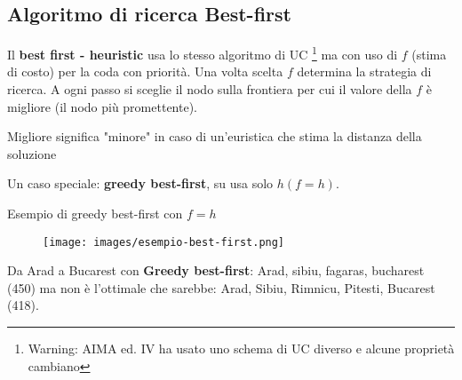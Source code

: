 \subsection{Algoritmo di ricerca Best-first}
Il \textbf{best first - heuristic} usa lo stesso algoritmo di UC \footnote{Warning: AIMA ed. IV ha usato uno schema di
UC diverso e alcune proprietà cambiano} ma con uso di $f$ (stima di costo) per la coda con priorità.
Una volta scelta $f$ determina la strategia di ricerca. A ogni passo si sceglie il nodo sulla frontiera per cui il valore della $f$ è 
migliore (il nodo più promettente).
\begin{note}
    Migliore significa "minore" in caso di un'euristica che stima la distanza della soluzione
\end{note}
\hspace{-15pt}Un caso speciale: \textbf{greedy best-first}, su usa solo $h (f=h)$.
\begin{example}
    Esempio di greedy best-first con $f=h$
    \begin{figure}[h!]
        \centering
        \texttt{[image: images/esempio-best-first.png]}
    \end{figure}
    Da Arad a Bucarest con \textbf{Greedy best-first}: Arad, sibiu, fagaras, bucharest (450) ma non è l'ottimale
    che sarebbe: Arad, Sibiu, Rimnicu, Pitesti, Bucarest (418).
\end{example}

